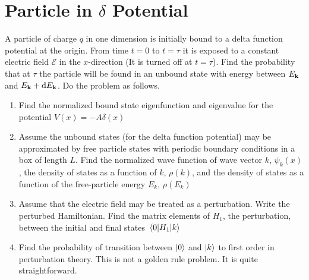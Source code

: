 \documentclass[12pt]{article}
\begin{document}
\section{Particle in $\delta$ Potential}
\begin{problem}
  A particle of charge $q$ in one dimension is initially bound to a delta function potential at the origin. From time $t=0$ to $t=\tau$ it is exposed to a constant electric field $\mathcal{E}$ in the $x$-direction (It is turned off at $t=\tau$).  Find the probability that at $\tau$ the particle will be found in an unbound state with energy between $E_{\vb{k}}$ and $E_{\vb{k}}+\dd{E_{\vb{k}}}$. Do the problem as follows.
  \begin{enumerate}[label = (\alph*)]
  \item Find the normalized bound state eigenfunction and eigenvalue for the potential $V(x)=-A\delta(x)$
  \item Assume the unbound states (for the delta function potential) may be approximated by free particle states with periodic boundary conditions in a box of length $L$. Find the normalized wave function of wave vector $k$, $\psi_k(x)$, the density of states as a function of $k$, $\rho(k)$, and the density of states as a function of the free-particle energy $E_k$, $\rho(E_k)$
  \item Assume that the electric field may be treated as a perturbation. Write the perturbed Hamiltonian. Find the matrix elements of $H_1$, the perturbation, between the initial and final states $\mel{0}{H_1}{k}$
  \item Find the probability of transition between $\ket{0}$ and $\ket{k}$ to first order in perturbation theory. This is not a golden rule problem. It is quite straightforward.
  \end{enumerate}
\end{problem}
\end{document}
